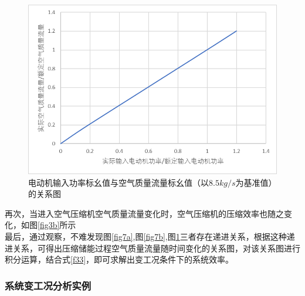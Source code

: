 \documentclass[journal,onecolumn]{IEEEtran}
\begin{document}
\begin{figure}[h]
	\centering
	\includegraphics[width=0.7\linewidth]{pictures/screenshot017}
	\caption{电动机输入功率标幺值与空气质量流量标幺值（以$ 8.5kg/s $为基准值）的关系图}
	\label{fig:screenshot017}
\end{figure}

再次，当进入空气压缩机空气质量流量变化时，空气压缩机的压缩效率也随之变化，如图\ref{fig3b}所示\\

最后，通过观察，不难发现图\ref{fig7a},图\ref{fig7b},图\ref{fig:screenshot017}三者存在递进关系，根据这种递进关系，可得出压缩储能过程空气质量流量随时间变化的关系图，对该关系图进行积分运算，结合式\ref{f33}，即可求解出变工况条件下的系统效率。\\

\subsubsection{系统变工况分析实例}
\end{document}
